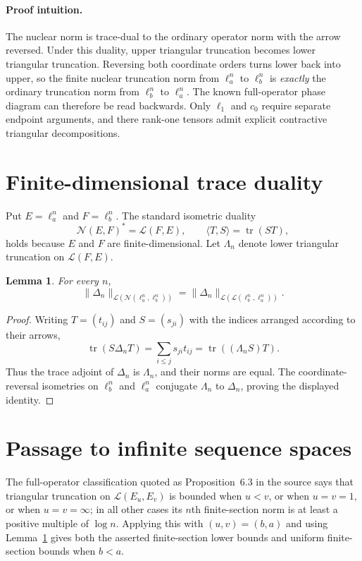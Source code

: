 \documentclass[11pt,a4paper]{article}
\newtheorem{lemma}{Lemma}
\newcommand{\Nuc}{\mathcal N}
\newcommand{\Lop}{\mathcal L}
\newcommand{\Dlt}{\Delta}
\begin{document}
\paragraph{Proof intuition.}
The nuclear norm is trace-dual to the ordinary operator norm with the arrow
reversed.  Under this duality, upper triangular truncation becomes lower
triangular truncation.  Reversing both coordinate orders turns lower back
into upper, so the finite nuclear truncation norm from $\ell_a^n$ to
$\ell_b^n$ is \emph{exactly} the ordinary truncation norm from $\ell_b^n$ to
$\ell_a^n$.  The known full-operator phase diagram can therefore be read
backwards.  Only $\ell_1$ and $c_0$ require separate endpoint arguments,
and there rank-one tensors admit explicit contractive triangular
decompositions.

\section*{Finite-dimensional trace duality}
Put $E=\ell_a^n$ and $F=\ell_b^n$.  The standard isometric duality
\[
 \Nuc(E,F)^*=\Lop(F,E),\qquad
 \langle T,S\rangle=\operatorname{tr}(ST),
\]
holds because $E$ and $F$ are finite-dimensional.  Let $\Lambda_n$ denote
lower triangular truncation on $\Lop(F,E)$.

\begin{lemma}\label{lem:duality}
For every $n$,
\[
 \|\Dlt_n\|_{\Lop(\Nuc(\ell_a^n,\ell_b^n))}
 =
 \|\Dlt_n\|_{\Lop(\Lop(\ell_b^n,\ell_a^n))}.
\]
\end{lemma}

\begin{proof}
Writing $T=(t_{ij})$ and $S=(s_{ji})$ with the indices arranged according to
their arrows,
\[
 \operatorname{tr}(S\Dlt_nT)
 =\sum_{i\le j}s_{ji}t_{ij}
 =\operatorname{tr}((\Lambda_nS)T).
\]
Thus the trace adjoint of $\Dlt_n$ is $\Lambda_n$, and their norms are equal.
The coordinate-reversal isometries on $\ell_b^n$ and $\ell_a^n$ conjugate
$\Lambda_n$ to $\Dlt_n$, proving the displayed identity.
\end{proof}

\section*{Passage to infinite sequence spaces}
The full-operator classification quoted as Proposition~6.3 in the source
\cite[p.~19]{RST} says that triangular truncation on
$\Lop(E_u,E_v)$ is bounded when $u<v$, or when $u=v=1$, or when
$u=v=\infty$; in all other cases its $n$th finite-section norm is at least a
positive multiple of $\log n$.  Applying this with $(u,v)=(b,a)$ and using
Lemma~\ref{lem:duality} gives both the asserted finite-section lower bounds
and uniform finite-section bounds when $b<a$.
\end{document}
